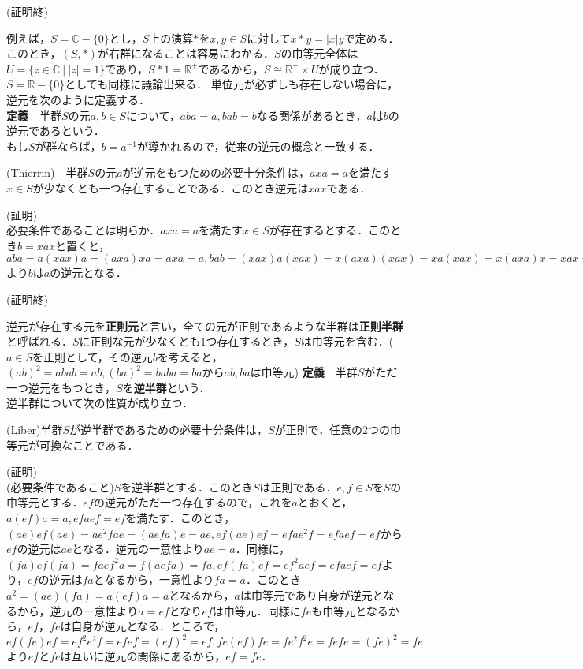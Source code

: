 \begin{flushright}
(証明終)
\end{flushright}
例えば，$S={\mathbb C}-\{0\}$とし，$S$上の演算$*$を$x,y\in S$に対して$x*y=|x|y$で定める．このとき，$(S,*)$が右群になることは容易にわかる．$S$の巾等元全体は$U=\{z\in{\mathbb C}\:|\:|z|=1\}$であり，$S*1={\mathbb R^+}$であるから，$S\cong {\mathbb R^+}\times U$が成り立つ．$S={\mathbb R}-\{0\}$としても同様に議論出来る．
単位元が必ずしも存在しない場合に，逆元を次のように定義する．\\
{\bf 定義}　半群$S$の元$a,b\in S$について，$aba=a,bab=b$なる関係があるとき，$a$は$b$の逆元であるという．\\
もし$S$が群ならば，$b=a^{-1}$が導かれるので，従来の逆元の概念と一致する．
\begin{sprop}
(Thierrin)　半群$S$の元$a$が逆元をもつための必要十分条件は，$axa=a$を満たす$x\in S$が少なくとも一つ存在することである．このとき逆元は$xax$である．
\end{sprop}
(証明)\\
必要条件であることは明らか．$axa=a$を満たす$x\in S$が存在するとする．このとき$b=xax$と置くと，$aba=a(xax)a=(axa)xa=axa=a, bab=(xax)a(xax)=x(axa)(xax)=xa(xax)=x(axa)x=xax=b$より$b$は$a$の逆元となる．
\begin{flushright}
(証明終)
\end{flushright}
逆元が存在する元を{\bf 正則元}と言い，全ての元が正則であるような半群は{\bf 正則半群}と呼ばれる．$S$に正則な元が少なくとも1つ存在するとき，$S$は巾等元を含む．($a\in S$を正則として，その逆元$b$を考えると，$(ab)^2=abab=ab, (ba)^2=baba=ba$から$ab,ba$は巾等元)
{\bf 定義}　半群$S$がただ一つ逆元をもつとき，$S$を{\bf 逆半群}という．\\
逆半群について次の性質が成り立つ．
\begin{sthm}
(Liber)半群$S$が逆半群であるための必要十分条件は，$S$が正則で，任意の2つの巾等元が可換なことである．
\end{sthm}
(証明)\\
(必要条件であること)$S$を逆半群とする．このとき$S$は正則である．$e,f\in S$を$S$の巾等元とする．$ef$の逆元がただ一つ存在するので，これを$a$とおくと，$a(ef)a=a,efaef=ef$を満たす．このとき，$(ae)ef(ae)=ae^2fae=(aefa)e=ae,ef(ae)ef=efae^2f=efaef=ef$から$ef$の逆元は$ae$となる．逆元の一意性より$ae=a$．同様に，$(fa)ef(fa)=faef^2a=f(aefa)=fa,ef(fa)ef=ef^2aef=efaef=ef$より，$ef$の逆元は$fa$となるから，一意性より$fa=a$．このとき$a^2=(ae)(fa)=a(ef)a=a$となるから，$a$は巾等元であり自身が逆元となるから，逆元の一意性より$a=ef$となり$ef$は巾等元．同様に$fe$も巾等元となるから，$ef$，$fe$は自身が逆元となる．ところで，$ef(fe)ef=ef^2e^2f=efef=(ef)^2=ef,fe(ef)fe=fe^2f^2e=fefe=(fe)^2=fe$より$ef$と$fe$は互いに逆元の関係にあるから，$ef=fe$．\\

